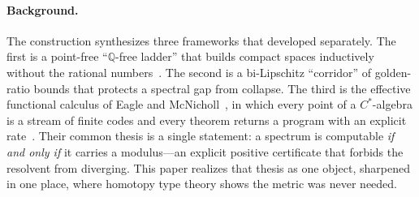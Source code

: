 \documentclass[11pt,letterpaper]{article}
\theoremstyle{plain}
\theoremstyle{definition}
\theoremstyle{remark}
\newcommand{\QQ}{\mathbb{Q}}
\begin{document}
\paragraph{Background.}
The construction synthesizes three frameworks that developed separately. The first
is a point-free ``$\QQ$-free ladder'' that builds compact spaces inductively
without the rational numbers~\citep{iaom_climbing}. The second is a bi-Lipschitz
``corridor'' of golden-ratio bounds that protects a spectral gap from collapse. The
third is the effective functional calculus of Eagle and
McNicholl~\citep{eagle2017computable}, in which every point of a $C^\ast$-algebra is
a stream of finite codes and every theorem returns a program with an explicit
rate~\citep{iaom_spectrum}. Their common thesis is a single statement: a spectrum is
computable \emph{if and only if} it carries a modulus---an explicit positive
certificate that forbids the resolvent from diverging. This paper realizes that
thesis as one object, sharpened in one place, where homotopy type
theory shows the metric was never needed.
\end{document}
